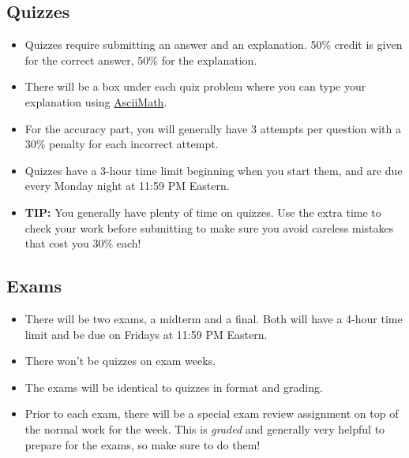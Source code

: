 \documentclass[11pt]{exam}
\begin{document}
    \vspace{10px}
    \subsection{Quizzes}
    \begin{itemize}
        \item Quizzes require submitting an answer and an explanation. 50\% credit is given for the correct answer, 50\% for the explanation.
        \item There will be a box under each quiz problem where you can type your explanation using \href{https://asciimath.org/}{AsciiMath}.
        \item For the accuracy part, you will generally have 3 attempts per question with a 30\% penalty for each incorrect attempt.
        \item Quizzes have a 3-hour time limit beginning when you start them, and are due every Monday night at 11:59 PM Eastern.
        \item \textbf{TIP:} You generally have plenty of time on quizzes. Use the extra time to check your work before submitting to make sure
        you avoid careless mistakes that cost you 30\% each! 
    \end{itemize}
    
    \vspace{10px}
    \subsection{Exams}
    \begin{itemize}
        \item There will be two exams, a midterm and a final. Both will have a 4-hour time limit and be due on Fridays at 11:59 PM Eastern.
        \item There won't be quizzes on exam weeks.
        \item The exams will be identical to quizzes in format and grading.
        \item Prior to each exam, there will be a special exam review assignment on top of the normal work for the week. This is \textit{graded} and
        generally very helpful to prepare for the exams, so make sure to do them!
    \end{itemize}
    
    \vspace{10px}
\end{document}
